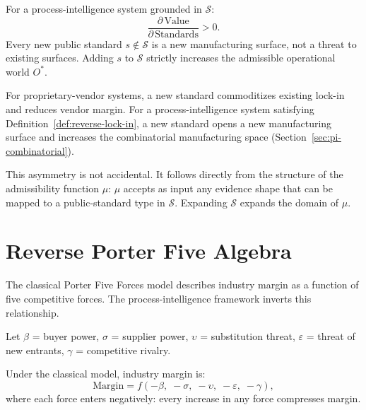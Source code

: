 \begin{definition}
\label{def:reverse-lock-in}
For a process-intelligence system grounded in $\mathcal{S}$:
\[
  \frac{\partial\,\mathrm{Value}}{\partial\,\mathrm{Standards}} > 0.
\]
Every new public standard $s \notin \mathcal{S}$ is a new manufacturing
surface, not a threat to existing surfaces. Adding $s$ to $\mathcal{S}$
strictly increases the admissible operational world $O^*$.
\end{definition}

\begin{proposition}
For proprietary-vendor systems, a new standard commoditizes existing lock-in
and reduces vendor margin. For a process-intelligence system satisfying
Definition~\ref{def:reverse-lock-in}, a new standard opens a new manufacturing
surface and increases the combinatorial manufacturing space
(Section~\ref{sec:pi-combinatorial}).
\end{proposition}

This asymmetry is not accidental. It follows directly from the structure of
the admissibility function $\mu$: $\mu$ accepts as input any evidence shape
that can be mapped to a public-standard type in $\mathcal{S}$. Expanding
$\mathcal{S}$ expands the domain of $\mu$.

\section{Reverse Porter Five Algebra}
\label{sec:pi-porter}

The classical Porter Five Forces model describes industry margin as a function
of five competitive forces. The process-intelligence framework inverts this
relationship.

\begin{definition}
\label{def:porter-vars}
Let $\beta$ = buyer power, $\sigma$ = supplier power, $\upsilon$ =
substitution threat, $\varepsilon$ = threat of new entrants, $\gamma$ =
competitive rivalry.
\end{definition}

\begin{definition}
\label{def:conventional-margin}
Under the classical model, industry margin is:
\[
  \mathrm{Margin} = f(-\beta,\; -\sigma,\; -\upsilon,\; -\varepsilon,\;
  -\gamma),
\]
where each force enters negatively: every increase in any force compresses
margin.
\end{definition}

